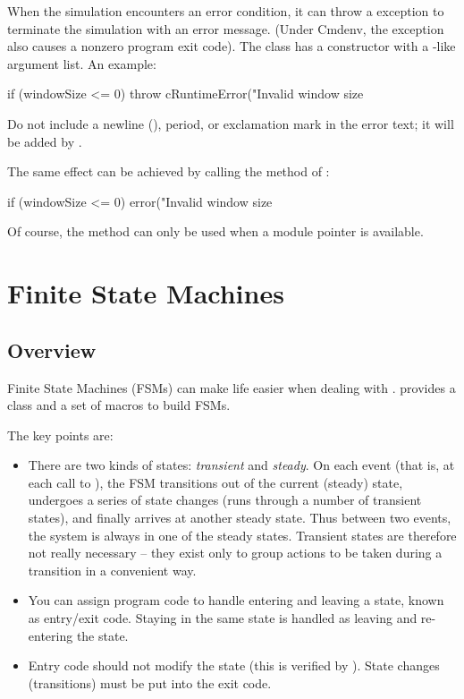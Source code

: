 When the simulation encounters an error condition, it can throw a
 exception to terminate the simulation with an error
message. (Under Cmdenv, the exception also causes a nonzero program exit
code). The  class has a constructor with a
-like argument list. An example:

\begin{cpp}
if (windowSize <= 0)
    throw cRuntimeError("Invalid window size %
\end{cpp}

Do not include a newline (), period, or exclamation mark
in the error text; it will be added by {\opp}.

The same effect can be achieved by calling the  method of
:

\begin{cpp}
if (windowSize <= 0)
    error("Invalid window size %
\end{cpp}

Of course, the  method can only be used when a module pointer
is available.



\section{Finite State Machines}
\label{sec:simple-modules:fsm}

\subsection{Overview}
\label{sec:simple-modules:fsm-overview}

Finite State Machines (FSMs)
can make life easier when dealing with . {\opp} provides a
class and a set of macros to build FSMs.

The key points are:

\begin{itemize}
  \item There are two kinds of states: \textit{transient} and \textit{steady}. On
    each event (that is, at each call to ), the FSM
    transitions out of the current (steady) state, undergoes a series of state
    changes (runs through a number of transient states), and finally arrives at
    another steady state. Thus between two events, the system is always in one of
    the steady states. Transient states are therefore not really necessary -- they
    exist only to group actions to be taken during a transition in a convenient way.
  \item You can assign program code to handle entering and leaving a state, known
    as entry/exit code. Staying in the same state is handled as leaving and
    re-entering the state.
  \item Entry code should not modify the state (this is verified by {\opp}). State
    changes (transitions) must be put into the exit code.
\end{itemize}

